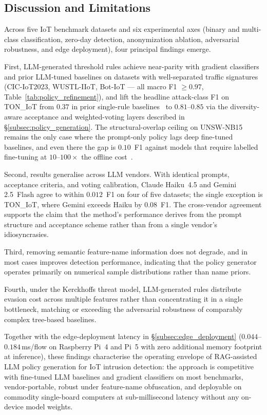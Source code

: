 \subsection{Discussion and Limitations}

Across five IoT benchmark datasets and six experimental axes (binary and multi-class classification, zero-day detection, anonymization ablation, adversarial robustness, and edge deployment), four principal findings emerge.

First, LLM-generated threshold rules achieve near-parity with gradient
classifiers and prior LLM-tuned baselines on datasets with well-separated
traffic signatures (CIC-IoT2023, WUSTL-IIoT, Bot-IoT — all macro F1
$\geq 0.97$, Table~\ref{tab:policy_refinement}), and lift the headline
attack-class F1 on TON\_IoT from $0.37$ in prior single-rule
baselines~\cite{ton_ensemble_2024} to $0.81$--$0.85$ via the
diversity-aware acceptance and weighted-voting layers described in
\S\ref{subsec:policy_generation}. The structural-overlap ceiling on
UNSW-NB15 remains the only case where the prompt-only policy lags deep
fine-tuned baselines, and even there the gap is $0.10$~F1 against models
that require labelled fine-tuning at $10$--$100\times$ the offline
cost~\cite{rulemaster_2025}.

Second, results generalise across LLM vendors. With identical prompts,
acceptance criteria, and voting calibration, Claude Haiku~4.5 and Gemini
2.5~Flash agree to within $0.012$~F1 on four of five datasets; the
single exception is TON\_IoT, where Gemini exceeds Haiku by $0.08$~F1.
The cross-vendor agreement supports the claim that the method's
performance derives from the prompt structure and acceptance scheme
rather than from a single vendor's idiosyncrasies.

Third, removing semantic feature-name information does not degrade, and
in most cases improves detection performance, indicating that the policy
generator operates primarily on numerical sample distributions rather
than name priors.

Fourth, under the Kerckhoffs threat model, LLM-generated rules
distribute evasion cost across multiple features rather than concentrating
it in a single bottleneck, matching or exceeding the adversarial
robustness of comparably complex tree-based baselines.

Together with the edge-deployment latency in \S\ref{subsec:edge_deployment}
($0.044$--$0.184$\,ms/flow on Raspberry Pi~4 and Pi~5 with zero additional
memory footprint at inference), these findings characterise the operating
envelope of RAG-assisted LLM policy generation for IoT intrusion
detection: the approach is competitive with fine-tuned LLM baselines and
gradient classifiers on most benchmarks, vendor-portable, robust under
feature-name obfuscation, and deployable on commodity single-board
computers at sub-millisecond latency without any on-device model weights.

